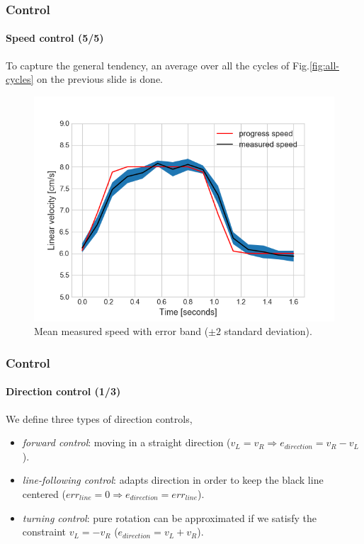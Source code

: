 \documentclass[10pt]{beamer}
\begin{document}
\begin{frame}
\frametitle{Control}
\framesubtitle{Speed control (5/5)}
To capture the general tendency, an average over all the cycles of Fig.\ref{fig:all-cycles} on the previous slide is done. 
\begin{figure}[hbtp]
\centering
\label{fig:average-pid}
\includegraphics[scale=0.45]{figures/pid_speed_shaded.png}
\caption{Mean measured speed with error band ($\pm 2$ standard deviation).}
\end{figure}
\end{frame}


\begin{frame}[label={frame:control-direction}]
\frametitle{Control}
\framesubtitle{Direction control (1/3)}
We define three types of direction controls,
\begin{itemize}
\item \textit{forward control}: moving in a straight direction ($v_L = v_R \Rightarrow e_{direction} = v_R - v_L$).
\item \textit{line-following control}: adapts direction in order to keep the black line centered ($err_{line} = 0 \Rightarrow e_{direction} = err_{line}$).
\item \textit{turning control}: pure rotation can be approximated if we satisfy the constraint  $v_L = -v_R$ ($e_{direction} = v_L + v_R$).
\end{itemize}
\end{frame}

\end{document}
